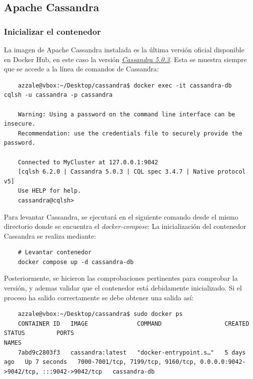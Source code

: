 \documentclass{article}
\begin{document}
\subsection{Apache Cassandra}\label{subsec:Apache Cassandra}

\subsubsection{Inicializar el contenedor}
La imagen de Apache Cassandra instalada es la última versión oficial disponible en Docker Hub, en este caso la versión
\textit{\textcolor{blue}{\href{https://github.com/docker-library/cassandra/blob/105daf8445a12fc96ef48a1314566e0f61f473b2/5.0/Dockerfile}{Cassandra 5.0.3}}}. Esta se muestra siempre que se accede a la línea de comandos de Cassandra:

\begin{tcolorbox}[colback=black, coltext=white, fontupper=\ttfamily, title=Terminal]
\begin{verbatim}
    azzale@vbox:~/Desktop/cassandra$ docker exec -it cassandra-db cqlsh -u cassandra -p cassandra 

    Warning: Using a password on the command line interface can be insecure.
    Recommendation: use the credentials file to securely provide the password.

    Connected to MyCluster at 127.0.0.1:9042
    [cqlsh 6.2.0 | Cassandra 5.0.3 | CQL spec 3.4.7 | Native protocol v5]
    Use HELP for help.
    cassandra@cqlsh> 
\end{verbatim}
\end{tcolorbox}

Para levantar Cassandra, se ejecutará en el siguiente comando desde el mismo directorio donde se encuentra el \textit{docker-compose}:
La inicialización del contenedor Cassandra se realiza mediante:
\begin{lstlisting}
    # Levantar contenedor
    docker compose up -d cassandra-db
\end{lstlisting}

Posteriormente, se hicieron las comprobaciones pertinentes para comprobar la versión, y ademas validar que el contenedor está debidamente inicializado. Si el proceso ha salido correctamente se debe obtener una salida así:

\begin{tcolorbox}[colback=black, coltext=white, fontupper=\ttfamily, title=Terminal]
\begin{verbatim}
    azzale@vbox:~/Desktop/cassandra$ sudo docker ps
    CONTAINER ID   IMAGE              COMMAND                  CREATED      STATUS         PORTS                                                                          NAMES
    7abd9c2803f3   cassandra:latest   "docker-entrypoint.s…"   5 days ago   Up 7 seconds   7000-7001/tcp, 7199/tcp, 9160/tcp, 0.0.0.0:9042->9042/tcp, :::9042->9042/tcp   cassandra-db

\end{verbatim}
\end{tcolorbox}
\end{document}
